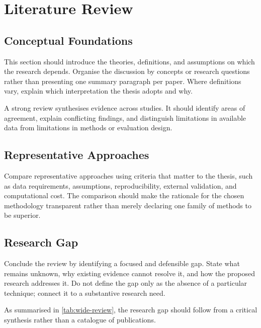 \chapter{Literature Review}
\label{ch:literature-review}

\section{Conceptual Foundations}

This section should introduce the theories, definitions, and assumptions on which
the research depends. Organise the discussion by concepts or research questions
rather than presenting one summary paragraph per paper. Where definitions vary,
explain which interpretation the thesis adopts and why.

A strong review synthesises evidence across studies. It should identify areas of
agreement, explain conflicting findings, and distinguish limitations in available
data from limitations in methods or evaluation design.

\section{Representative Approaches}

Compare representative approaches using criteria that matter to the thesis, such
as data requirements, assumptions, reproducibility, external validation, and
computational cost. The comparison should make the rationale for the chosen
methodology transparent rather than merely declaring one family of methods to be
superior.



\section{Research Gap}

Conclude the review by identifying a focused and defensible gap. State what remains
unknown, why existing evidence cannot resolve it, and how the proposed research
addresses it. Do not define the gap only as the absence of a particular technique;
connect it to a substantive research need.

As summarised in \cref{tab:wide-review}, the research gap should follow from a critical synthesis rather than a catalogue of publications.
